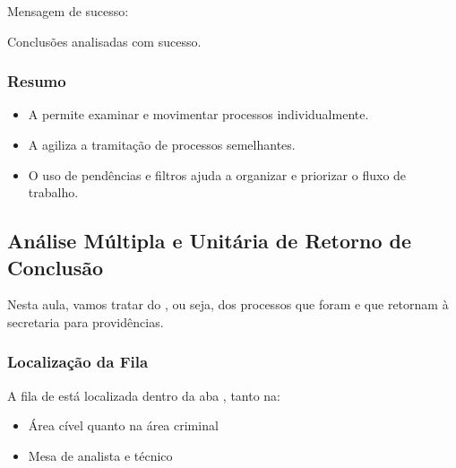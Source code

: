 \documentclass[letterpaper,10pt,brazil]{sphinxmanual}
\begin{document}
\sphinxAtStartPar
Mensagem de sucesso:

\sphinxAtStartPar
Conclusões analisadas com sucesso.


\subsubsection{Resumo}
\label{\detokenize{projud_06_analisejuntada_multiplaeunitaria:resumo}}\begin{itemize}
\item {} 
\sphinxAtStartPar
A  permite examinar e movimentar processos individualmente.

\item {} 
\sphinxAtStartPar
A  agiliza a tramitação de processos semelhantes.

\item {} 
\sphinxAtStartPar
O uso de pendências e filtros ajuda a organizar e priorizar o fluxo de trabalho.

\end{itemize}

\sphinxstepscope


\subsection{Análise Múltipla e Unitária de Retorno de Conclusão}
\label{\detokenize{projud_07_analisejuntada_multiplaeunitariaconclusos:analise-multipla-e-unitaria-de-retorno-de-conclusao}}\label{\detokenize{projud_07_analisejuntada_multiplaeunitariaconclusos::doc}}
\sphinxAtStartPar
Nesta aula, vamos tratar do , ou seja, dos processos que foram  e que retornam à secretaria para providências.


\subsubsection{Localização da Fila}
\label{\detokenize{projud_07_analisejuntada_multiplaeunitariaconclusos:localizacao-da-fila}}
\sphinxAtStartPar
A fila de  está localizada dentro da aba , tanto na:
\begin{itemize}
\item {} 
\sphinxAtStartPar
Área cível quanto na área criminal

\item {} 
\sphinxAtStartPar
Mesa de analista e técnico

\end{itemize}
\end{document}
